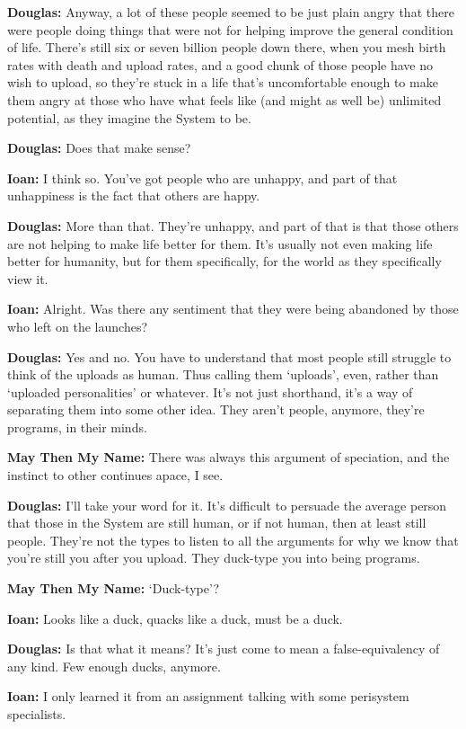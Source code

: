 \textbf{Douglas:} Anyway, a lot of these people seemed to be just plain angry that there were people doing things that were not for helping improve the general condition of life. There's still six or seven billion people down there, when you mesh birth rates with death and upload rates, and a good chunk of those people have no wish to upload, so they're stuck in a life that's uncomfortable enough to make them angry at those who have what feels like (and might as well be) unlimited potential, as they imagine the System to be.

\textbf{Douglas:} Does that make sense?

\textbf{Ioan:} I think so. You've got people who are unhappy, and part of that unhappiness is the fact that others are happy.

\textbf{Douglas:} More than that. They're unhappy, and part of that is that those others are not helping to make life better for them. It's usually not even making life better for humanity, but for them specifically, for the world as they specifically view it.

\textbf{Ioan:} Alright. Was there any sentiment that they were being abandoned by those who left on the launches?

\textbf{Douglas:} Yes and no. You have to understand that most people still struggle to think of the uploads as human. Thus calling them `uploads', even, rather than `uploaded personalities' or whatever. It's not just shorthand, it's a way of separating them into some other idea. They aren't people, anymore, they're programs, in their minds.

\textbf{May Then My Name:} There was always this argument of speciation, and the instinct to other continues apace, I see.

\textbf{Douglas:} I'll take your word for it. It's difficult to persuade the average person that those in the System are still human, or if not human, then at least still people. They're not the types to listen to all the arguments for why we know that you're still you after you upload. They duck-type you into being programs.

\textbf{May Then My Name:} `Duck-type'?

\textbf{Ioan:} Looks like a duck, quacks like a duck, must be a duck.

\textbf{Douglas:} Is that what it means? It's just come to mean a false-equivalency of any kind. Few enough ducks, anymore.

\textbf{Ioan:} I only learned it from an assignment talking with some perisystem specialists.

